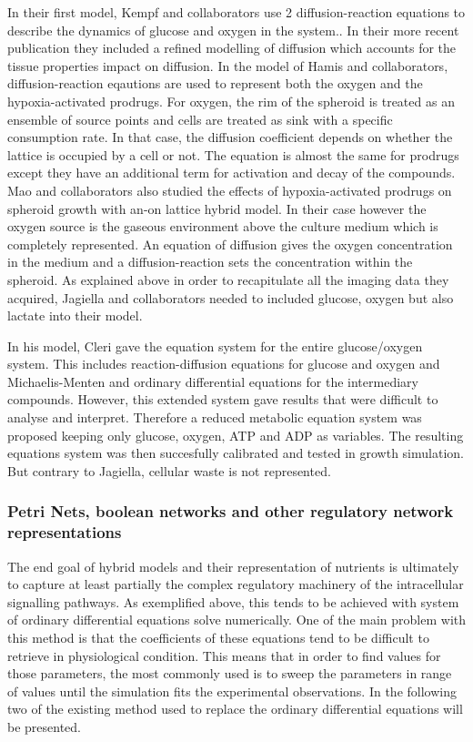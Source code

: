 \documentclass[11pt,a4paper]{article}
\begin{document}
In their first model, Kempf and collaborators use 2 diffusion-reaction equations to describe the dynamics of glucose and oxygen in the system.\cite{Kempf2005}. In their more recent publication they included a refined modelling of diffusion which accounts for the tissue properties impact on diffusion.\cite{Kempf2015} In the model of Hamis and collaborators, diffusion-reaction eqautions are used to represent both the oxygen and the hypoxia-activated prodrugs.\cite{Hamis2020} For oxygen, the rim of the spheroid is treated as an ensemble of source points and cells are treated as sink with a specific consumption rate. In that case, the diffusion coefficient depends on whether the lattice is occupied by a cell or not. The equation is almost the same for prodrugs except they have an additional term for activation and decay of the compounds. Mao and collaborators also studied the effects of hypoxia-activated prodrugs on spheroid growth with an-on lattice hybrid model. In their case however the oxygen source is the gaseous environment above the culture medium which is completely represented. An equation of diffusion gives the oxygen concentration in the medium and a diffusion-reaction sets the concentration within the spheroid. As explained above in order to recapitulate all the imaging data they acquired, Jagiella and collaborators needed to included glucose, oxygen but also lactate into their model.\cite{Jagiella2016}

In his model, Cleri gave the equation system for the entire glucose/oxygen system.\cite{Cleri2019} This includes reaction-diffusion equations for glucose and oxygen and Michaelis-Menten and ordinary differential equations for the intermediary compounds. However, this extended system gave results that were difficult to analyse and interpret. Therefore a reduced metabolic equation system was proposed keeping only glucose, oxygen, ATP and ADP as variables. The resulting equations system was then succesfully calibrated and tested in growth simulation. But contrary to Jagiella, cellular waste is not represented.

\subsubsection{Petri Nets, boolean networks and other regulatory network representations}
The end goal of hybrid models and their representation of nutrients is ultimately to capture at least partially the complex regulatory machinery of the intracellular signalling pathways. As exemplified above, this tends to be achieved with system of ordinary differential equations solve numerically. One of the main problem with this method is that the coefficients of these equations tend to be difficult to retrieve in physiological condition. This means that in order to find values for those parameters, the most commonly used is to sweep the parameters in range of values until the simulation fits the experimental observations. In the following two of the existing method used to replace the ordinary differential equations will be presented.
\end{document}
